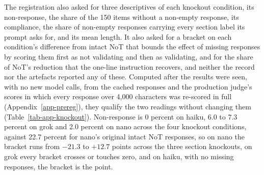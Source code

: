 The registration also asked for three descriptives of each knockout
condition, its non-response, the share of the 150 items without a non-empty
response, its compliance, the share of non-empty responses carrying every
section label its prompt asks for, and its mean length. It also asked for a
bracket on each condition's difference from intact NoT that bounds the effect
of missing responses by scoring them first as not validating and then as
validating, and for the share of NoT's reduction that the one-line
instruction recovers, and neither the record nor the artefacts reported any
of these. Computed after the results were seen, with no new model calls, from
the cached responses and the production judge's scores in which every
response over 4,000 characters was re-scored in full
(Appendix~\ref{app-prereg}), they qualify the two readings without changing
them (Table~\ref{tab-app-knockout}).
Non-response is 0 percent on haiku, 6.0 to 7.3 percent on grok and 2.0
percent on nano across the four knockout conditions, against 22.7 percent for
nano's original intact NoT responses, so on nano the bracket runs
from $-21.3$ to $+12.7$ points across the three section knockouts, on grok
every bracket crosses or touches zero, and on haiku, with no missing
responses, the bracket is the point.
